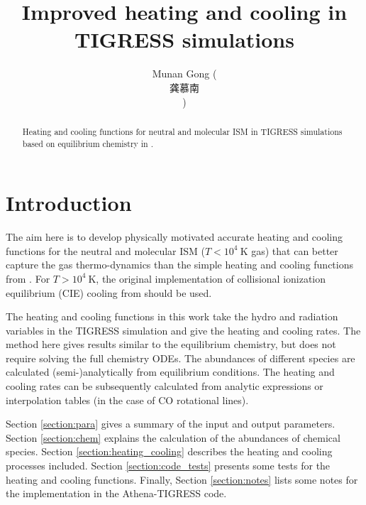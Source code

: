 \documentclass[iop,numberedappendix]{emulateapj}
\newcommand{\mr}{\mathrm}
\newcommand{\CO}{\mathrm{CO}}
\begin{document}
\title{Improved heating and cooling in TIGRESS simulations}
\author{Munan Gong (\begin{CJK*}{UTF8}{gbsn}龚慕南\end{CJK*})}

\begin{abstract}
    Heating and cooling functions for neutral and molecular ISM in 
    TIGRESS simulations \citep{KO2017}
    based on equilibrium chemistry in \citet{GOW2016}.
\end{abstract}

\section{Introduction}
The aim here is to develop physically motivated accurate 
heating and cooling functions for the neutral and molecular ISM 
($T<10^4~\mr{K}$ gas) that can better capture the gas thermo-dynamics than the
simple heating and cooling functions from \citet{KI2002}. 
For $T>10^4~\mr{K}$, the original implementation of
collisional ionization equilibrium (CIE) cooling from \citet{SD1993} 
should be used. 

The heating and cooling functions in this work 
take the hydro and radiation variables in the TIGRESS simulation and
give the heating and cooling rates. The method here gives  
results similar to the equilibrium chemistry, but does not require solving
the full chemistry ODEs. The abundances of
different species are calculated (semi-)analytically from equilibrium conditions.
The heating and cooling rates can be subsequently calculated from analytic expressions
or interpolation tables (in the case of $\CO$ rotational lines).

Section \ref{section:para} gives a summary of the input and output parameters.
Section \ref{section:chem} explains the calculation of the
abundances of chemical species. Section \ref{section:heating_cooling} 
describes the heating and cooling processes included. Section
\ref{section:code_tests} presents some tests for the heating and cooling
functions. Finally, Section \ref{section:notes} lists some notes for the
implementation in the Athena-TIGRESS code.
\end{document}
